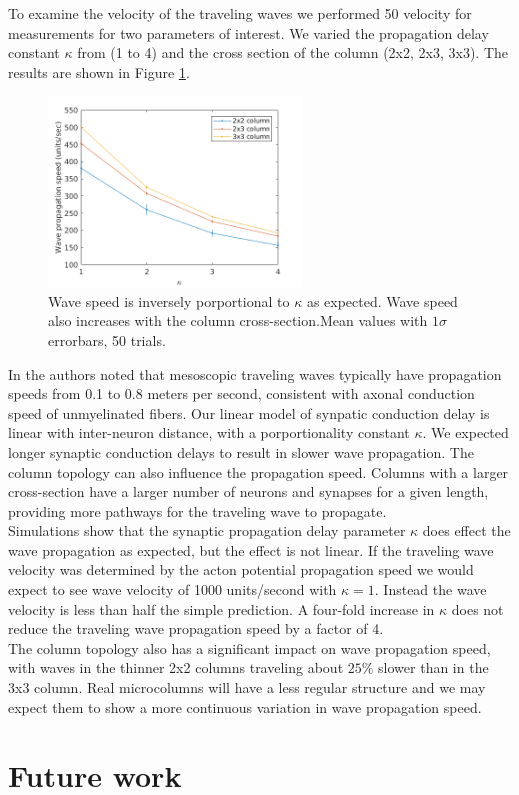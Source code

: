 \documentclass[a4paper,11pt]{article}
\begin{document}
To examine the velocity of the traveling waves we performed 50 velocity for measurements for two parameters of interest.
We varied the propagation delay constant $\kappa$ from (1 to 4) and the cross section of the column (2x2, 2x3, 3x3).
The results are shown in Figure \ref{fig:delay_topology}.
\begin{figure}[!htb]
 \caption{Wave speed is inversely porportional to $\kappa$ as expected. Wave speed also increases with the column cross-section.Mean values with $1\sigma$ errorbars, 50 trials.}
 \label{fig:delay_topology}
 \centering
   \includegraphics[width=0.6\textwidth]{fig/WaveSpeed_DelayTopology}
\end{figure}
In \cite{muller2018} the authors noted that mesoscopic traveling waves typically have propagation speeds from 0.1 to 0.8 meters per second, consistent with axonal conduction speed of unmyelinated fibers.
Our linear model of synpatic conduction delay is linear with inter-neuron distance, with a porportionality constant $\kappa$.
We expected longer synaptic conduction delays to result in slower wave propagation.
The column topology can also influence the propagation speed.
Columns with a larger cross-section have a larger number of neurons and synapses for a given length, providing more pathways for the traveling wave to propagate. \\
Simulations show that the synaptic propagation delay parameter $\kappa$ does effect the wave propagation as expected, but the effect is not linear.
If the traveling wave velocity was determined by the acton potential propagation speed we would expect to see wave velocity of 1000 units/second with $\kappa=1$.
Instead the wave velocity is less than half the simple prediction.
A four-fold increase in $\kappa$ does not reduce the traveling wave propagation speed by a factor of 4. \\
The column topology also has a significant impact on wave propagation speed, with waves in the thinner 2x2 columns traveling about $25\%$ slower than in the 3x3 column.
Real microcolumns will have a less regular structure and we may expect them to show a more continuous variation in wave propagation speed. 




\section{Future work}


\clearpage
\printbibliography
\end{document}
